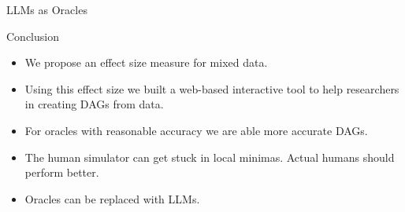 \documentclass{beamer}
\begin{document}
\begin{frame}{LLMs as Oracles}
\end{frame}

\begin{frame}{Conclusion}
	\begin{itemize}
		\item We propose an effect size measure for mixed data.
		\item Using this effect size we built a web-based interactive tool to help researchers in creating DAGs from data.
		\item For oracles with reasonable accuracy we are able more accurate DAGs.
		\item The human simulator can get stuck in local minimas. Actual humans should perform better.
		\item Oracles can be replaced with LLMs.
	\end{itemize}
\end{frame}
\end{document}
